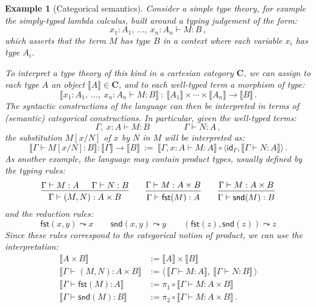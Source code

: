 \documentclass[draft,11pt]{report}
\newtheorem{example}[theorem]{Example}
\theoremstyle{definition}
\newcommand{\kw}[1]{\ensuremath{ \mathsf{#1} }}
\begin{document}
\begin{example}[Categorical semantics] \label{ex:ttcc} %
Consider a simple type theory,
for example the simply-typed lambda calculus,
built around a typing judgement of the form:
\[
  x_1 : A_1, \: \ldots, \: x_n : A_n \vdash M : B
  \,,
\]
which asserts that the term $M$ has type $B$
in a context where each variable $x_i$
has type $A_i$.

To interpret a type theory of this kind in
a cartesian category $\mathbf{C}$,
we can assign to each type $A$
an object $\llbracket A \rrbracket \in \mathbf{C}$,
and to each well-typed term a morphism of type:
\[
  \llbracket x_1 : A_1, \: \ldots, \: x_n : A_n \vdash M : B \rrbracket
  \: : \:
  \llbracket A_1 \rrbracket \times \cdots \times
  \llbracket A_n \rrbracket \rightarrow
  \llbracket B \rrbracket
  \,.
\]
The syntactic constructions of the language
can then be interpreted in terms of
(semantic) categorical constructions.
In particular,
given the well-typed terms:
\[
  \Gamma, \: x : A \vdash M : B
  \qquad \qquad
  \Gamma \vdash N : A
  \,,
\]
the substitution $M[x/N]$ of $x$ by $N$ in $M$
will be interpreted as:
\[
  \llbracket \Gamma \vdash M[x/N] : B \rrbracket
  :
  \llbracket \Gamma \rrbracket \rightarrow \llbracket B \rrbracket
  \: := \:
  \llbracket \Gamma, x:A \vdash M : A \rrbracket \circ
  \langle
    \kw{id}_\Gamma,
    \llbracket \Gamma \vdash N : A \rrbracket
  \rangle
  \,.
\]
As another example,
the language may contain product types,
usually defined by the typing rules:
\[
  \begin{prooftree}
    \hypo{\Gamma \vdash M : A}
    \hypo{\Gamma \vdash N : B}
    \infer2{\Gamma \vdash (M, N) : A \times B}
  \end{prooftree}
  \qquad
  \begin{prooftree}
    \hypo{\Gamma \vdash M : A \times B}
    \infer1{\Gamma \vdash \kw{fst}(M) : A}
  \end{prooftree}
  \qquad
  \begin{prooftree}
    \hypo{\Gamma \vdash M : A \times B}
    \infer1{\Gamma \vdash \kw{snd}(M) : B}
  \end{prooftree}
\]
and the reduction rules:
\[
  \kw{fst}(x, y) \leadsto x
  \qquad
  \kw{snd}(x, y) \leadsto y
  \qquad
  (\kw{fst}(z), \kw{snd}(z)) \leadsto z
\]
Since these rules correspond to the categorical notion of product,
we can use the interpretation:
\begin{align*}
  \llbracket A \times B \rrbracket &:=
    \llbracket A \rrbracket \times \llbracket B \rrbracket \\
  \llbracket \Gamma \vdash (M, N) : A \times B \rrbracket &:=
    \langle \,
      \llbracket \Gamma \vdash M : A \rrbracket, \:
      \llbracket \Gamma \vdash N : B \rrbracket \,
    \rangle \\
  \llbracket \Gamma \vdash \kw{fst}(M) : A \rrbracket &:=
    \pi_1 \circ \llbracket \Gamma \vdash M : A \times B \rrbracket \\
  \llbracket \Gamma \vdash \kw{snd}(M) : B \rrbracket &:=
    \pi_2 \circ \llbracket \Gamma \vdash M : A \times B \rrbracket
  \,.
\end{align*}
\end{example}
\end{document}
